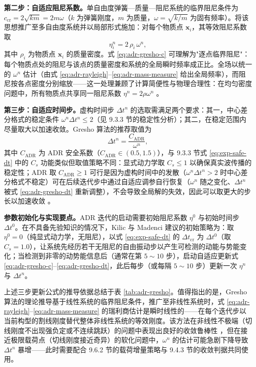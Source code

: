 \textbf{第二步：自适应阻尼系数。}单自由度弹簧—质量—阻尼系统的临界阻尼条件为 $c_{\text{cr}}=2\sqrt{km}=2m\omega$（$k$ 为弹簧刚度，$m$ 为质量，$\omega=\sqrt{k/m}$ 为固有频率）。将该思想推广至多自由度系统并以局部形式施加：对每个物质点 $\mathbf{x}_i$，其等效阻尼系数取
\begin{equation}
  \eta_i^{n}
  =2\,\rho_i\,\omega^{n},
  \label{eq:adr-gresho-c}
\end{equation}
其中 $\rho_i$ 为物质点 $\mathbf{x}_i$ 的质量密度。式 \eqref{eq:adr-gresho-c} 可理解为"逐点临界阻尼"：每个物质点处的阻尼与该点的质量密度和系统的全局瞬时频率成正比。全场以统一的 $\omega^{n}$ 估计（由式 \eqref{eq:adr-rayleigh}--\eqref{eq:adr-mass-measure} 给出全局频率），而阻尼按各点密度分别缩放——这一处理兼顾了计算简便性与物理合理性：在均匀密度问题中，所有物质点共享同一阻尼系数 $\eta^{n}=2\rho\omega^{n}$ \cite{KilicMadenci2010}。

\textbf{第三步：自适应时间步。}虚构时间步 $\Delta t^{n}$ 的选取需满足两个要求：其一，中心差分格式的稳定条件 $\omega^{n}\Delta t^{n}\le2$（见 9.3.3 节的稳定性分析）；其二，在稳定范围内尽量取大以加速收敛。Gresho 算法的推荐取值为
\begin{equation}
  \Delta t^{n}
  =\frac{C_{\text{ADR}}}{\omega^{n}},
  \label{eq:adr-gresho-dt}
\end{equation}
其中 $C_{\text{ADR}}$ 为 ADR 安全系数（$C_{\text{ADR}}\in(0.5,1.5)$），与 9.3.3 节式 \eqref{eq:exp-safe-dt} 中的 $C_s$ 功能类似但取值策略不同：显式动力学取 $C_s\le1$ 以确保真实波传播的稳定性；ADR 取 $C_{\text{ADR}}\ge1$ 可行是因为虚构时间中的发散（$\omega^{n}\Delta t^{n}>2$ 时中心差分格式不稳定）可在后续迭代步中通过自适应调参自行恢复（$\omega^{n}$ 随之变化、$\Delta t^{n}$ 被式 \eqref{eq:adr-gresho-dt} 重新调整），不会导致全局解的失效，因此可以取更大的步长以加速收敛 \cite{KilicMadenci2010}。

\textbf{参数初始化与实现要点。}ADR 迭代的启动需要初始阻尼系数 $\eta^{0}$ 与初始时间步 $\Delta t^{0}$。在不具备先验知识的情况下，Kilic 与 Madenci 建议的初始策略为：取 $\eta^{0}=0$（纯显式动力学，无阻尼），以式 \eqref{eq:exp-safe-dt} 的 $\Delta t_{\text{cr}}$ 为 $\Delta t^{0}$（取 $C_s=1.0$），让系统先经历若干无阻尼的自由振动步以产生可检测的动能与势能变化；当检测到非零的动势能信息后（通常在第 $5\sim10$ 步），启动自适应更新式 \eqref{eq:adr-gresho-c}--\eqref{eq:adr-gresho-dt}，此后每步（或每隔 $5\sim10$ 步）更新一次 $\eta^{n}$ 与 $\Delta t^{n}$。

上述三步更新公式的推导依据总结于表 \ref{tab:adr-gresho}。值得指出的是，Gresho 算法的理论推导基于线性系统的临界阻尼条件，推广至非线性系统时，式 \eqref{eq:adr-rayleigh}--\eqref{eq:adr-mass-measure} 的瑞利商估计是瞬时线性的——在每个迭代步以当前构型的割线刚度替代整体非线性系统的等效刚度。该方法在非线性不极端（切线刚度不出现强负定或不连续跳跃）的问题中表现出良好的收敛鲁棒性 \cite{KilicMadenci2010}，但在接近极限载荷点（切线刚度接近奇异）的软化问题中，$\omega^{n}$ 的估计可能急剧下降导致 $\Delta t^{n}$ 暴增——此时需要配合 9.6.2 节的载荷增量策略与 9.4.3 节的收敛判据共同使用。

